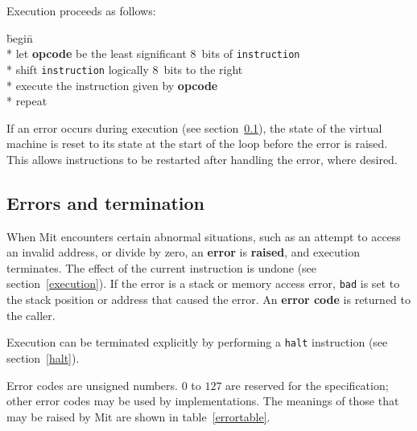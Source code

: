 \documentclass[a4paper]{article}
\newcommand{\instsize}{$8$}
\begin{document}
Execution proceeds as follows:

\begin{tabbing}
\hspace{0.5in}\=begin\=\+\+ \\*
let \textbf{opcode} be the least significant \instsize\ bits of {\tt instruction} \\*
shift {\tt instruction} logically \instsize\ bits to the right \\*
execute the instruction given by \textbf{opcode} \- \\*
repeat
\end{tabbing}

If an error occurs during execution (see section~\ref{errors}), the state of the virtual machine is reset to its state at the start of the loop before the error is raised. This allows instructions to be restarted after handling the error, where desired.

\subsection{Errors and termination}
\label{errors}

When Mit encounters certain abnormal situations, such as an attempt to access an invalid address, or divide by zero, an {\bf error} is {\bf raised}, and execution terminates. The effect of the current instruction is undone (see section~\ref{execution}). If the error is a stack or memory access error, {\tt bad} is set to the stack position or address that caused the error. An {\bf error code} is returned to the caller.

Execution can be terminated explicitly by performing a {\tt halt} instruction (see section~\ref{halt}).

Error codes are unsigned numbers. $0$ to $127$ are reserved for the specification; other error codes may be used by implementations. The meanings of those that may be raised by Mit are shown in table~\ref{errortable}.
\end{document}
